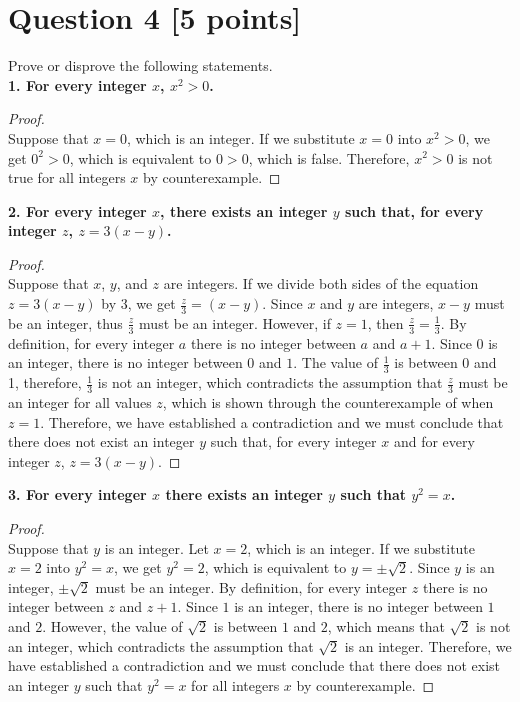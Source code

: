\documentclass{report}
\theoremstyle{mytheoremstyle}
\theoremstyle{mytheoremstyle}
\theoremstyle{myproblemstyle}
\begin{document}
\section*{Question 4 [5 points]}
Prove or disprove the following statements. 
\\[\baselineskip]
\noindent\textbf{1. For every integer $x$, $x^2 > 0$.}
\begin{proof} 
    $ $\\
    Suppose that $x = 0$, which is an integer. If we substitute $x = 0$ into $x^2 > 0$, we get $0^2 > 0$, which is equivalent to $0 > 0$, which is false. Therefore, $x^2 > 0$ is not true for all integers $x$ by counterexample.
\end{proof} 
\noindent\textbf{2. For every integer $x$, there exists an integer $y$ such that, for every integer $z$, $z = 3(x - y)$.} 
\begin{proof}
    $ $\\ 
    Suppose that $x$, $y$, and $z$ are integers. If we divide both sides of the equation $z=3(x-y)$ by $3$, we get $\frac{z}{3}=(x-y)$. Since $x$ and $y$ are integers, $x-y$ must be an integer, thus $\frac{z}{3}$ must be an integer. However, if $z = 1$, then $\frac{z}{3} = \frac{1}{3}$. By definition, for every integer $a$ there is no integer between $a$ and $a+1$. Since $0$ is an integer, there is no integer between $0$ and $1$. The value of $\frac{1}{3}$ is between 0 and 1, therefore, $\frac{1}{3}$ is not an integer, which contradicts the assumption that $\frac{z}{3}$ must be an integer for all values $z$, which is shown through the counterexample of when $z=1$. Therefore, we have established a contradiction and we must conclude that there does not exist an integer $y$ such that, for every integer $x$ and for every integer $z$, $z = 3(x - y)$.
\end{proof}
\noindent\textbf{3. For every integer $x$ there exists an integer $y$ such that $y^2 = x$.}
\begin{proof}
    $ $\\ 
    Suppose that $y$ is an integer. Let $x = 2$, which is an integer.  If we substitute $x = 2$ into $y^2 = x$, we get $y^2 = 2$, which is equivalent to $y = \pm \sqrt{2}$. Since $y$ is an integer, $\pm \sqrt{2}$ must be an integer. By definition, for every integer $z$ there is no integer between $z$ and $z+1$. Since $1$ is an integer, there is no integer between $1$ and $2$. However, the value of $\sqrt{2}$ is between $1$ and $2$, which means that $\sqrt{2}$ is not an integer, which contradicts the assumption that $\sqrt{2}$ is an integer. Therefore, we have established a contradiction and we must conclude that there does not exist an integer $y$ such that $y^2 = x$ for all integers $x$ by counterexample.
\end{proof} 
\end{document}
